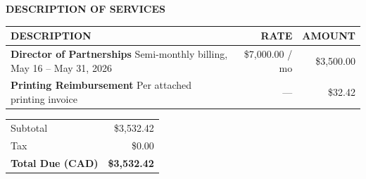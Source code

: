 \documentclass[11pt,a4paper]{article}
\renewcommand{\arraystretch}{1.25}
\newcommand{\eyebrowsimple}[1]{%
  \textcolor{faint}{\fontsize{8}{10}\selectfont\textbf{\MakeUppercase{#1}}}%
}
\begin{document}
\vspace{0.7cm}

\eyebrowsimple{Description of Services}
\vspace{6pt}

\renewcommand{\arraystretch}{1.5}
\begin{tabularx}{\textwidth}{@{} >{\RaggedRight}X r r @{}}
\hline
\rowcolor{soft}
{\fontsize{8}{10}\selectfont\textbf{\textcolor{muted}{\MakeUppercase{Description}}}} &
{\fontsize{8}{10}\selectfont\textbf{\textcolor{muted}{\MakeUppercase{Rate}}}} &
{\fontsize{8}{10}\selectfont\textbf{\textcolor{muted}{\MakeUppercase{Amount}}}} \\
\hline
\textcolor{ink}{\textbf{Director of Partnerships}}\newline
\textcolor{muted}{\footnotesize Semi-monthly billing, May 16 -- May 31, 2026}
& \textcolor{body}{\$7,000.00 / mo}
& \textcolor{ink}{\$3,500.00} \\
\hline
\textcolor{ink}{\textbf{Printing Reimbursement}}\newline
\textcolor{muted}{\footnotesize Per attached printing invoice}
& \textcolor{body}{---}
& \textcolor{ink}{\$32.42} \\
\hline
\end{tabularx}

\vspace{0.3cm}

\hfill
\begin{minipage}{0.45\textwidth}
\renewcommand{\arraystretch}{1.35}
\begin{tabularx}{\textwidth}{@{} X r @{}}
\textcolor{muted}{Subtotal} & \textcolor{body}{\$3,532.42} \\
\textcolor{muted}{Tax} & \textcolor{body}{\$0.00} \\
\hline
\rowcolor{soft}
\textcolor{ink}{\textbf{Total Due (CAD)}} &
{\fontsize{16}{18}\selectfont\textcolor{ink}{\textbf{\$3,532.42}}} \\
\hline
\end{tabularx}
\end{minipage}

\vspace{0.85cm}

\end{document}
